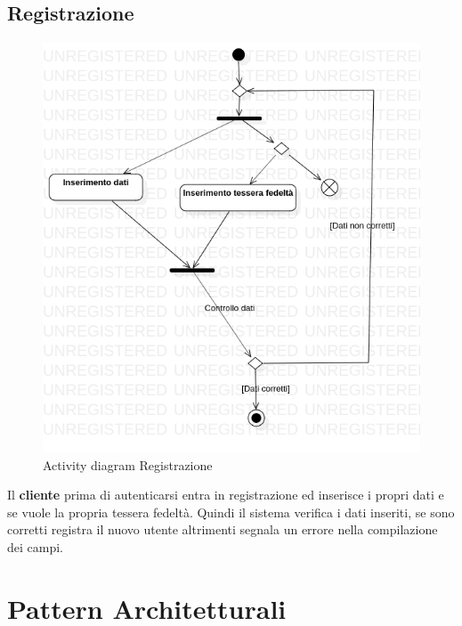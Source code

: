 \documentclass[12pt, a4paper]{article}
\begin{document}
\subsection{Registrazione}
\begin{figure}[H]
\centering
\includegraphics[width=\linewidth]{Use Case Model!Registrazione!ActivityRegistrazione!ActivityDiagramRegistrazione_2.png}
\caption{Activity diagram Registrazione}
\end{figure}

Il \textbf{cliente} prima di autenticarsi entra in registrazione ed inserisce i propri dati e se vuole la propria tessera fedeltà. 
Quindi il sistema verifica i dati inseriti, se sono corretti registra il nuovo utente altrimenti segnala un errore nella compilazione dei campi.

\section{Pattern Architetturali}
\end{document}
